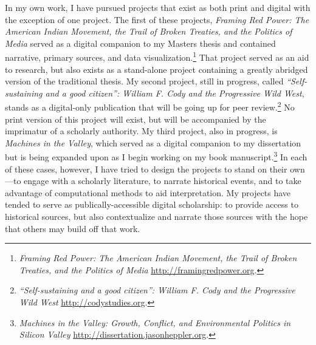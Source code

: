 \documentclass[11pt,]{article}
\begin{document}
In my own work, I have pursued projects that exist as both print and
digital with the exception of one project. The first of these projects,
\emph{Framing Red Power: The American Indian Movement, the Trail of
Broken Treaties, and the Politics of Media} served as a digital
companion to my Masters thesis and contained narrative, primary sources,
and data visualization.\footnote{\emph{Framing Red Power: The American
  Indian Movement, the Trail of Broken Treaties, and the Politics of
  Media} \url{http://framingredpower.org}.} That project served as an
aid to research, but also exists as a stand-alone project containing a
greatly abridged version of the traditional thesis. My second project,
still in progress, called \emph{``Self-sustaining and a good citizen'':
William F. Cody and the Progressive Wild West}, stands as a digital-only
publication that will be going up for peer review.\footnote{\emph{``Self-sustaining
  and a good citizen'': William F. Cody and the Progressive Wild West}
  \url{http://codystudies.org}.} No print version of this project will
exist, but will be accompanied by the imprimatur of a scholarly
authority. My third project, also in progress, is \emph{Machines in the
Valley}, which served as a digital companion to my dissertation but is
being expanded upon as I begin working on my book manuscript.\footnote{\emph{Machines
  in the Valley: Growth, Conflict, and Environmental Politics in Silicon
  Valley} \url{http://dissertation.jasonheppler.org}.} In each of these
cases, however, I have tried to design the projects to stand on their
own---to engage with a scholarly literature, to narrate historical
events, and to take advantage of computational methods to aid
interpretation. My projects have tended to serve as
publically-accessible digital scholarship: to provide access to
historical sources, but also contextualize and narrate those sources
with the hope that others may build off that work.


\newpage
\singlespacing 
\end{document}
